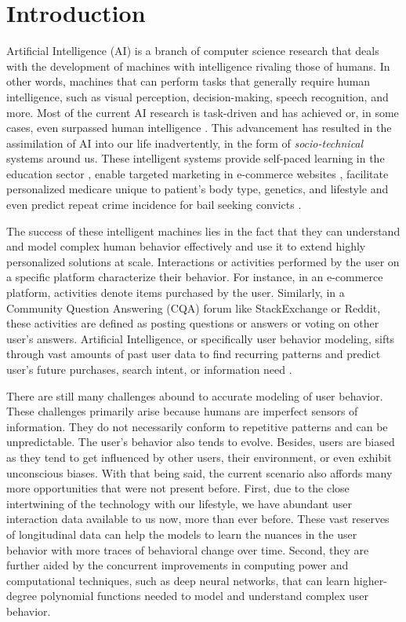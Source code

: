 \chapter{Introduction}
\label{chapter:introduction}

Artificial Intelligence (AI) is a branch of computer science research that deals with the development of machines with intelligence rivaling those of humans. In other words, machines that can perform tasks that generally require human intelligence, such as visual perception, decision-making, speech recognition, and more.
Most of the current AI research is task-driven and has achieved or, in some cases, even surpassed human intelligence \cite{devlin2019bert, GoogleNet, PRelu, AlphaGo}. This advancement has resulted in the assimilation of AI into our life inadvertently, in the form of \emph{socio-technical} systems around us. These intelligent systems provide self-paced learning in the education sector \cite{education}, enable targeted marketing in e-commerce websites \cite{targeted}, facilitate personalized medicare unique to patient's body type, genetics, and lifestyle \cite{medicine} and even predict repeat crime incidence for bail seeking convicts \cite{bail}.

The success of these intelligent machines lies in the fact that they can understand and model complex human behavior effectively and use it to extend highly personalized solutions at scale.
Interactions or activities performed by the user on a specific platform characterize their behavior. For instance, in an e-commerce platform, activities denote items purchased by the user. Similarly, in a Community Question Answering (CQA) forum like StackExchange or Reddit, these activities are defined as posting questions or answers or voting on other user's answers.
Artificial Intelligence, or specifically user behavior modeling, sifts through vast amounts of past user data to find recurring patterns and predict user's future purchases, search intent, or information need \cite{search, SAS:2018, beutel}.

There are still many challenges abound to accurate modeling of user behavior.
These challenges primarily arise because humans are imperfect sensors of information. They do not necessarily conform to repetitive patterns and can be unpredictable. The user's behavior also tends to evolve. Besides, users are biased as they tend to get influenced by other users, their environment, or even exhibit unconscious biases. With that being said, the current scenario also affords many more opportunities that were not present before. First, due to the close intertwining of the technology with our lifestyle, we have abundant user interaction data available to us now, more than ever before. These vast reserves of longitudinal data can help the models to learn the nuances in the user behavior with more traces of behavioral change over time. Second, they are further aided by the concurrent improvements in computing power and computational techniques, such as deep neural networks, that can learn higher-degree polynomial functions needed to model and understand complex user behavior.

